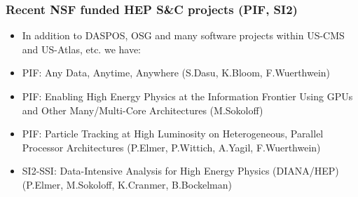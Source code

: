 \begin{frame}
\frametitle{Recent NSF funded HEP S\&C projects (PIF, SI2)}
\begin{itemize}
\item In addition to DASPOS, OSG and many software projects within US-CMS and US-Atlas, etc. we have: \\
\item PIF: Any Data, Anytime, Anywhere (S.Dasu, K.Bloom, F.Wuerthwein)
\item PIF: Enabling High Energy Physics at the Information Frontier Using GPUs and Other Many/Multi-Core Architectures (M.Sokoloff)
\item PIF: Particle Tracking at High Luminosity on Heterogeneous, Parallel Processor Architectures (P.Elmer, P.Wittich, A.Yagil, F.Wuerthwein)
\item SI2-SSI: Data-Intensive Analysis for High Energy Physics (DIANA/HEP) (P.Elmer, M.Sokoloff, K.Cranmer, B.Bockelman)
\end{itemize}

\end{frame}


